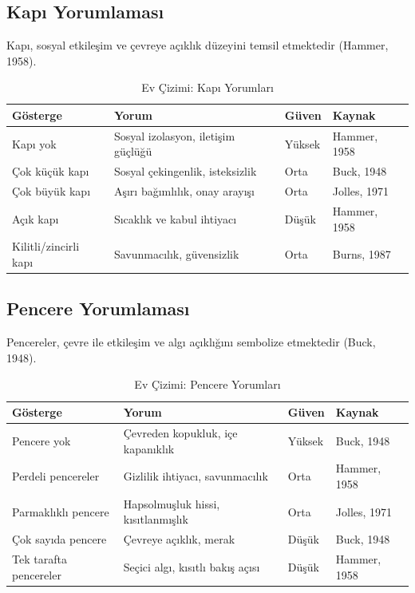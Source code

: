 \subsection{Kapı Yorumlaması}

Kapı, sosyal etkileşim ve çevreye açıklık düzeyini temsil etmektedir (Hammer, 1958).

\begin{table}[H]
\centering
\caption{Ev Çizimi: Kapı Yorumları}
\label{tab:evkapi}
\begin{tabular}{p{3.5cm}p{5.5cm}p{2cm}p{2cm}}
\toprule
\textbf{Gösterge} & \textbf{Yorum} & \textbf{Güven} & \textbf{Kaynak} \\
\midrule
Kapı yok & Sosyal izolasyon, iletişim güçlüğü & Yüksek & Hammer, 1958 \\
Çok küçük kapı & Sosyal çekingenlik, isteksizlik & Orta & Buck, 1948 \\
Çok büyük kapı & Aşırı bağımlılık, onay arayışı & Orta & Jolles, 1971 \\
Açık kapı & Sıcaklık ve kabul ihtiyacı & Düşük & Hammer, 1958 \\
Kilitli/zincirli kapı & Savunmacılık, güvensizlik & Orta & Burns, 1987 \\
\bottomrule
\end{tabular}
\end{table}

\subsection{Pencere Yorumlaması}

Pencereler, çevre ile etkileşim ve algı açıklığını sembolize etmektedir (Buck, 1948).

\begin{table}[H]
\centering
\caption{Ev Çizimi: Pencere Yorumları}
\label{tab:evpencere}
\begin{tabular}{p{3.5cm}p{5.5cm}p{2cm}p{2cm}}
\toprule
\textbf{Gösterge} & \textbf{Yorum} & \textbf{Güven} & \textbf{Kaynak} \\
\midrule
Pencere yok & Çevreden kopukluk, içe kapanıklık & Yüksek & Buck, 1948 \\
Perdeli pencereler & Gizlilik ihtiyacı, savunmacılık & Orta & Hammer, 1958 \\
Parmaklıklı pencere & Hapsolmuşluk hissi, kısıtlanmışlık & Orta & Jolles, 1971 \\
Çok sayıda pencere & Çevreye açıklık, merak & Düşük & Buck, 1948 \\
Tek tarafta pencereler & Seçici algı, kısıtlı bakış açısı & Düşük & Hammer, 1958 \\
\bottomrule
\end{tabular}
\end{table}

